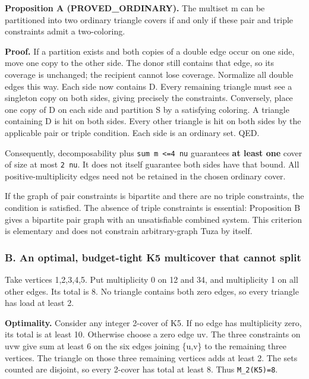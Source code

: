 \documentclass[11pt]{article}
\begin{document}
\textbf{Proposition A (PROVED\_ORDINARY).} The multiset m can be partitioned into two ordinary triangle covers if and only if these pair and triple constraints admit a two-coloring.

\textbf{Proof.} If a partition exists and both copies of a double edge occur on one side, move one copy to the other side. The donor still contains that edge, so its coverage is unchanged; the recipient cannot lose coverage. Normalize all double edges this way. Each side now contains D. Every remaining triangle must see a singleton copy on both sides, giving precisely the constraints. Conversely, place one copy of D on each side and partition S by a satisfying coloring. A triangle containing D is hit on both sides. Every other triangle is hit on both sides by the applicable pair or triple condition. Each side is an ordinary set. QED.

Consequently, decomposability plus \texttt{sum\ m\ \textless{}=4\ nu} guarantees \textbf{at least one} cover of size at most \texttt{2\ nu}. It does not itself guarantee both sides have that bound. All positive-multiplicity edges need not be retained in the chosen ordinary cover.

If the graph of pair constraints is bipartite and there are no triple constraints, the condition is satisfied. The absence of triple constraints is essential: Proposition B gives a bipartite pair graph with an unsatisfiable combined system. This criterion is elementary and does not constrain arbitrary-graph Tuza by itself.

\subsubsection{B. An optimal, budget-tight K5 multicover that cannot split}\label{b.-an-optimal-budget-tight-k5-multicover-that-cannot-split}

Take vertices 1,2,3,4,5. Put multiplicity 0 on 12 and 34, and multiplicity 1 on all other edges. Its total is 8. No triangle contains both zero edges, so every triangle has load at least 2.

\textbf{Optimality.} Consider any integer 2-cover of K5. If no edge has multiplicity zero, its total is at least 10. Otherwise choose a zero edge uv. The three constraints on uvw give sum at least 6 on the six edges joining \{u,v\} to the remaining three vertices. The triangle on those three remaining vertices adds at least 2. The sets counted are disjoint, so every 2-cover has total at least 8. Thus \texttt{M\_2(K5)=8}.
\end{document}
